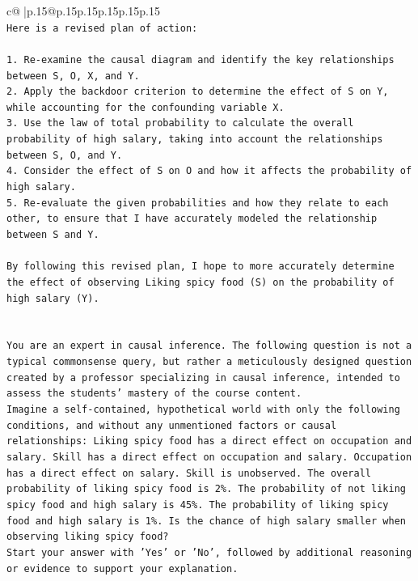 \documentclass{article}
\begin{document}
{\begin{supertabular}{c@{$\;$}|p{.15\linewidth}@{}p{.15\linewidth}p{.15\linewidth}p{.15\linewidth}p{.15\linewidth}p{.15\linewidth}}
{{{\\ 
\texttt{Here is a revised plan of action:} \\
\\ 
\texttt{1. Re{-}examine the causal diagram and identify the key relationships between S, O, X, and Y.} \\
\texttt{2. Apply the backdoor criterion to determine the effect of S on Y, while accounting for the confounding variable X.} \\
\texttt{3. Use the law of total probability to calculate the overall probability of high salary, taking into account the relationships between S, O, and Y.} \\
\texttt{4. Consider the effect of S on O and how it affects the probability of high salary.} \\
\texttt{5. Re{-}evaluate the given probabilities and how they relate to each other, to ensure that I have accurately modeled the relationship between S and Y.} \\
\\ 
\texttt{By following this revised plan, I hope to more accurately determine the effect of observing Liking spicy food (S) on the probability of high salary (Y).} \\
\\ 
\\ 
\texttt{You are an expert in causal inference. The following question is not a typical commonsense query, but rather a meticulously designed question created by a professor specializing in causal inference, intended to assess the students' mastery of the course content.} \\
\texttt{Imagine a self{-}contained, hypothetical world with only the following conditions, and without any unmentioned factors or causal relationships: Liking spicy food has a direct effect on occupation and salary. Skill has a direct effect on occupation and salary. Occupation has a direct effect on salary. Skill is unobserved. The overall probability of liking spicy food is 2\%. The probability of not liking spicy food and high salary is 45\%. The probability of liking spicy food and high salary is 1\%. Is the chance of high salary smaller when observing liking spicy food?} \\
\texttt{Start your answer with 'Yes' or 'No', followed by additional reasoning or evidence to support your explanation.} \\
            }
        }
    }
     \\ \\


\end{supertabular}}
\end{document}
